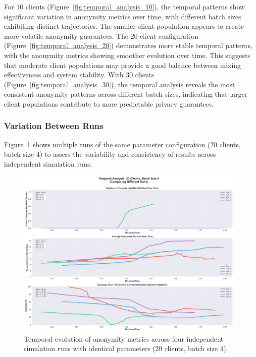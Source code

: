 \documentclass{article}
\begin{document}

For 10 clients (Figure~\ref{fig:temporal_analysis_10}), 
the temporal patterns show significant variation in anonymity 
metrics over time, with different batch sizes exhibiting 
distinct trajectories. The smaller client population appears 
to create more volatile anonymity guarantees. The 20-client 
configuration (Figure~\ref{fig:temporal_analysis_20}) 
demonstrates more stable temporal patterns, with the anonymity 
metrics showing smoother evolution over time. This suggests 
that moderate client populations may provide a good balance 
between mixing effectiveness and system stability. With 30 clients 
(Figure~\ref{fig:temporal_analysis_30}), the temporal analysis 
reveals the most consistent anonymity patterns across different 
batch sizes, indicating that larger client populations contribute 
to more predictable privacy guarantees.

\subsubsection{Variation Between Runs}

Figure~\ref{fig:temporal_analysis_20_4_runs} shows multiple 
runs of the same parameter configuration (20 clients, batch size 4) 
to assess the variability and consistency of results across 
independent simulation runs.

\begin{figure}[!htb]
\centering
\includegraphics[width=\textwidth]{diagrams/temporal_20client_4batch_runs.png}
\caption{Temporal evolution of anonymity metrics across four independent simulation runs with identical parameters (20 clients, batch size 4).}
\label{fig:temporal_analysis_20_4_runs}
\end{figure}
\end{document}
